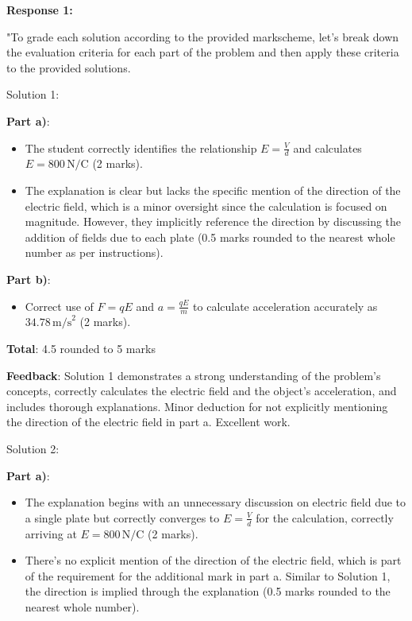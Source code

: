 \documentclass[a4paper,11pt]{article}
\begin{document}
\textbf{Response 1:}

"To grade each solution according to the provided markscheme, let's break down the evaluation criteria for each part of the problem and then apply these criteria to the provided solutions.

Solution 1:

\textbf{Part a)}:
\begin{itemize}
    \item The student correctly identifies the relationship $E = \frac{V}{d}$ and calculates $E = 800 \, \text{N/C}$ (2 marks).
    \item The explanation is clear but lacks the specific mention of the direction of the electric field, which is a minor oversight since the calculation is focused on magnitude. However, they implicitly reference the direction by discussing the addition of fields due to each plate (0.5 marks rounded to the nearest whole number as per instructions).
\end{itemize}

\textbf{Part b)}:
\begin{itemize}
    \item Correct use of $F = qE$ and $a = \frac{qE}{m}$ to calculate acceleration accurately as $34.78 \, \text{m/s}^2$ (2 marks).
\end{itemize}

\textbf{Total}: 4.5 rounded to 5 marks

\textbf{Feedback}: Solution 1 demonstrates a strong understanding of the problem's concepts, correctly calculates the electric field and the object's acceleration, and includes thorough explanations. Minor deduction for not explicitly mentioning the direction of the electric field in part a. Excellent work.

Solution 2:

\textbf{Part a)}:
\begin{itemize}
    \item The explanation begins with an unnecessary discussion on electric field due to a single plate but correctly converges to $E = \frac{V}{d}$ for the calculation, correctly arriving at $E = 800 \, \text{N/C}$ (2 marks).
    \item There's no explicit mention of the direction of the electric field, which is part of the requirement for the additional mark in part a. Similar to Solution 1, the direction is implied through the explanation (0.5 marks rounded to the nearest whole number).
\end{itemize}
\end{document}
